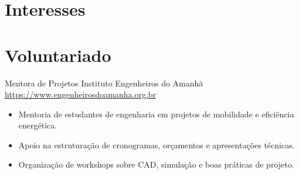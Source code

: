 \documentclass[a4paper, serif, 10pt]{moderncv}
\begin{document}
\section{Interesses}

\section{Voluntariado}

        {Mentora de Projetos}
        {Instituto Engenheiros do Amanhã}
        {\url{https://www.engenheirosdoamanha.org.br}}
        {}
        {\begin{itemize}
\item Mentoria de estudantes de engenharia em projetos de mobilidade e eficiência energética.
\item Apoio na estruturação de cronogramas, orçamentos e apresentações técnicas.
\item Organização de workshops sobre CAD, simulação e boas práticas de projeto.
\end{itemize}}
    
\end{document}

